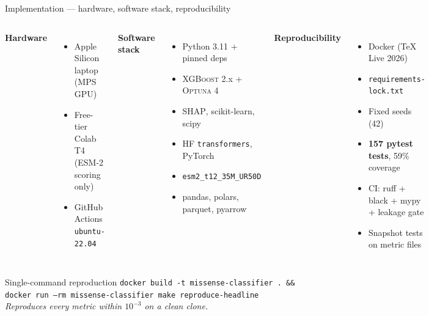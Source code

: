 \documentclass[aspectratio=169,10pt]{beamer}
\begin{document}
\begin{frame}{Implementation --- hardware, software stack, reproducibility}
  \footnotesize
  \begin{columns}[T]
    \textbf{\textcolor{kkuGreen}{Hardware}}
    \begin{itemize}\setlength{\itemsep}{0.15em}
      \item Apple Silicon laptop (MPS GPU)
      \item Free-tier Colab T4 (ESM-2 scoring only)
      \item GitHub Actions \texttt{ubuntu-22.04}
    \end{itemize}

    \textbf{\textcolor{kkuGreen}{Software stack}}
    \begin{itemize}\setlength{\itemsep}{0.1em}
      \item Python 3.11 + pinned deps
      \item \textsc{XGBoost} 2.x + \textsc{Optuna} 4
      \item \textsc{SHAP}, scikit-learn, scipy
      \item HF \texttt{transformers}, PyTorch
      \item \texttt{esm2\_t12\_35M\_UR50D}
      \item pandas, polars, parquet, pyarrow
    \end{itemize}

    \textbf{\textcolor{kkuGreen}{Reproducibility}}
    \begin{itemize}\setlength{\itemsep}{0.1em}
      \item Docker (TeX Live 2026)
      \item \texttt{requirements-lock.txt}
      \item Fixed seeds (42)
      \item \textbf{157 pytest tests}, 59\% coverage
      \item CI: ruff + black + mypy + leakage gate
      \item Snapshot tests on metric files
    \end{itemize}
  \end{columns}

  \vspace{0.6em}
  \begin{exampleblock}{Single-command reproduction}
    \scriptsize
    \texttt{docker build -t missense-classifier .\ \&\&}\\
    \texttt{\hphantom{XX}docker run --rm missense-classifier make reproduce-headline}\\[0.3em]
    \emph{Reproduces every metric within $10^{-3}$ on a clean clone.}
  \end{exampleblock}
\end{frame}
\end{document}
